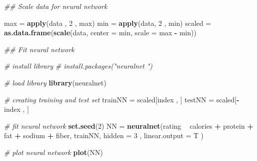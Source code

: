 \documentclass[]{book}
\newenvironment{Shaded}{\begin{snugshade}}{\end{snugshade}}
\newcommand{\CommentTok}[1]{\textcolor[rgb]{0.56,0.35,0.01}{\textit{#1}}}
\newcommand{\DataTypeTok}[1]{\textcolor[rgb]{0.13,0.29,0.53}{#1}}
\newcommand{\DecValTok}[1]{\textcolor[rgb]{0.00,0.00,0.81}{#1}}
\newcommand{\KeywordTok}[1]{\textcolor[rgb]{0.13,0.29,0.53}{\textbf{#1}}}
\newcommand{\NormalTok}[1]{#1}
\newcommand{\OperatorTok}[1]{\textcolor[rgb]{0.81,0.36,0.00}{\textbf{#1}}}
\newcommand{\StringTok}[1]{\textcolor[rgb]{0.31,0.60,0.02}{#1}}
\begin{document}
\begin{Shaded}
\begin{Highlighting}[]
\CommentTok{## Scale data for neural network}

\NormalTok{max =}\StringTok{ }\KeywordTok{apply}\NormalTok{(data , }\DecValTok{2}\NormalTok{ , max)}
\NormalTok{min =}\StringTok{ }\KeywordTok{apply}\NormalTok{(data, }\DecValTok{2}\NormalTok{ , min)}
\NormalTok{scaled =}\StringTok{ }\KeywordTok{as.data.frame}\NormalTok{(}\KeywordTok{scale}\NormalTok{(data, }\DataTypeTok{center =}\NormalTok{ min, }\DataTypeTok{scale =}\NormalTok{ max }\OperatorTok{-}\StringTok{ }\NormalTok{min))}
\end{Highlighting}
\end{Shaded}

\begin{Shaded}
\begin{Highlighting}[]
\CommentTok{## Fit neural network }

\CommentTok{# install library}
\CommentTok{# install.packages("neuralnet ")}

\CommentTok{# load library}
\KeywordTok{library}\NormalTok{(neuralnet)}

\CommentTok{# creating training and test set}
\NormalTok{trainNN =}\StringTok{ }\NormalTok{scaled[index , ]}
\NormalTok{testNN =}\StringTok{ }\NormalTok{scaled[}\OperatorTok{-}\NormalTok{index , ]}

\CommentTok{# fit neural network}
\KeywordTok{set.seed}\NormalTok{(}\DecValTok{2}\NormalTok{)}
\NormalTok{NN =}\StringTok{ }\KeywordTok{neuralnet}\NormalTok{(rating }\OperatorTok{~}\StringTok{ }\NormalTok{calories }\OperatorTok{+}\StringTok{ }\NormalTok{protein }\OperatorTok{+}\StringTok{ }\NormalTok{fat }\OperatorTok{+}\StringTok{ }\NormalTok{sodium }\OperatorTok{+}\StringTok{ }\NormalTok{fiber, }
\NormalTok{               trainNN, }\DataTypeTok{hidden =} \DecValTok{3}\NormalTok{ , }\DataTypeTok{linear.output =}\NormalTok{ T )}

\CommentTok{# plot neural network}
\KeywordTok{plot}\NormalTok{(NN)}
\end{Highlighting}
\end{Shaded}
\end{document}
